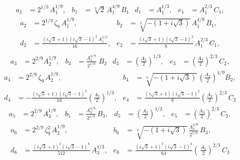 \documentclass[11pt]{amsart}
\numberwithin{equation}{section}
\numberwithin{table}{section}
\newcommand\<{\langle}
\begin{document}
\begin{align*}
	a_1 &  = 2^{1/3} \, A_1^{1/9}, &
	b_1 &=  \sqrt [3]{2}\,  A_1^{4/9} \, B_1&
	d_1 & = A_1^{1/3}, &
	e_1 & = A_1^{2/3}\,  C_1,
\end{align*}
%
\begin{align*}
	a_2 &  =  2^{1/3} \, \zeta_9 \, A_1^{1/9},&
	b_2 &=   \sqrt [3]{-(1+ i \sqrt{3})} \,
	A_1^{4/9}\,  B_1,\\
	d_2 & =\frac{ (i \sqrt{3} +1) (i \sqrt{3} -1)^3 \,  A_1^{1/3}}{16}, &
	e_2&  =\frac{ (i \sqrt{3} +1) (i \sqrt{3} -1)^2 }{8} \,  A_1^{2/3} \, C_1,\\
\end{align*}
%
\begin{align*}
	a_3 &   =2^{2/9} A_2^{1/9}, &
	b_3 &=  \frac{A_2^{4/9}}{2^{1/9}} \, \, B_2 &
	d_3 &=\left( \frac{A_2}{2}\right)^{1/3}, &
	e_3 & =\left( \frac{A_2}{2}\right) ^{2/3} \, C_2,
\end{align*}
%
\begin{align*}
	a_4 &  =  2^{2/9}\,  \zeta_9 \,  A_2^{1/9},&
	b_4 &=\sqrt [3]{-(1+ i \sqrt{3})} \,   \left(\frac{A_2}{2} \right)^{4/9}  B_2, \\
	d_4 & =  -\frac{ (i \sqrt{3} +1) (i \sqrt{3} -1)^3 }{16} \left(  \frac{A_2}{2}\right) ^{1/3},&
	e_4 & =\frac{ (i \sqrt{3} +1) (i \sqrt{3} -1)^2 }{8}  \left( \frac{A_2}{2}\right) ^{2/3} \, C_2
\end{align*}
%
\begin{align*}
	a_5 &  =2^{2/9}\, A_3^{1/9}, & 
	b_5 &=  \frac{A_3^{4/9}}{2^{1/9}}  \,B_3, &
	d_5 &= \left( \frac{A_3}{2}\right)^{1/3},  &
	e_5 &  =\left( \frac{A_3}{2}\right) ^{2/3} \,C_3,
\end{align*}
%
\begin{align*}
	a_6&=  2^{2/9} \, \zeta_9^2  \, A_2^{1/9},&
	b_6 &=    \sqrt [3]{-(1+ i \sqrt{3})} \, \frac{A_3^{4/9}}{2^{7/9}} \, B_3,\\
	d_6 &   =    \frac{\left( i \sqrt{3} +1\right)^2
		\left( i \sqrt{3} -1\right)^6  }{512}\, A_3^{1/3}  ,&
	e_6 & =\frac{ (i \sqrt{3} +1)^2 (i \sqrt{3} -1)^4 }{64} \left( \, \frac{A_3}{2}\right) ^{2/3} \, C_3
\end{align*}

 
\end{document}
